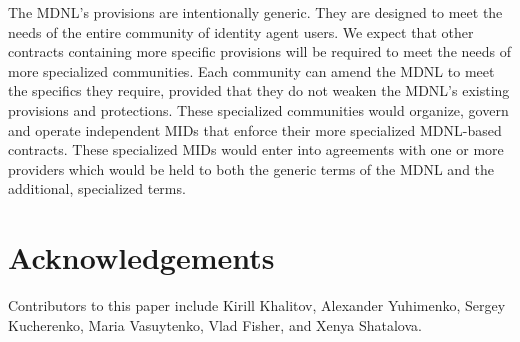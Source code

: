 \documentclass[11pt, oneside]{article}   	%
\begin{document}
The MDNL's provisions are intentionally generic. They are designed to meet the needs of the entire community of identity agent users. We expect that other contracts containing more specific provisions will be required to meet the needs of more specialized communities. Each community can amend the MDNL to meet the specifics they require, provided that they do not weaken the MDNL's existing provisions and protections. These specialized communities would organize, govern and operate independent MIDs that enforce their more specialized MDNL-based contracts. These specialized MIDs would enter into agreements with one or more providers which would be held to both the generic terms of the MDNL and the additional, specialized terms.

\section{Acknowledgements}
Contributors to this paper include Kirill Khalitov, Alexander Yuhimenko, Sergey Kucherenko, Maria Vasuytenko, Vlad Fisher, and Xenya Shatalova.



\end{document}
